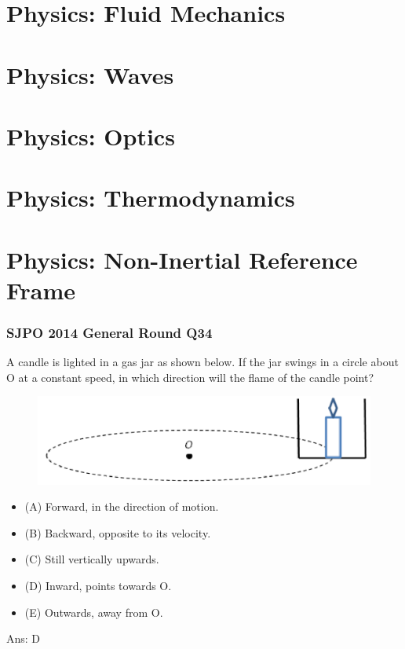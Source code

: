 \documentclass{article}
\begin{document}
\section{Physics: Fluid Mechanics}
\section{Physics: Waves}
\section{Physics: Optics}
\section{Physics: Thermodynamics}
\section{Physics: Non-Inertial Reference Frame}

\subsubsection{SJPO 2014 General Round Q34}
A candle is lighted in a gas jar as shown below. If the jar swings in a circle about O at a constant speed, in which direction will the flame of the candle point?
\begin{figure}
\includegraphics[width=1.0\linewidth]{images/sjpo2014q34.png}
\end{figure}
\begin{itemize}
\item[] (A) Forward, in the direction of motion.
\item[] (B) Backward, opposite to its velocity.
\item[] (C) Still vertically upwards.
\item[] (D) Inward, points towards $\mathrm{O}$.
\item[] (E) Outwards, away from O.
\end{itemize}
Ans: \ifpaper D \fi
\end{document}
